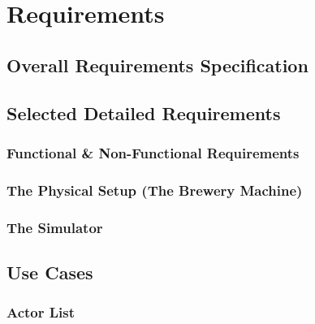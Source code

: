 \section{Requirements}

\subsection{Overall Requirements Specification}

\subsection{Selected Detailed Requirements}

\subsubsection{Functional \& Non-Functional Requirements}

\subsubsection{The Physical Setup (The Brewery Machine)}

\subsubsection{The Simulator}


\subsection{Use Cases}

\subsubsection{Actor List}

